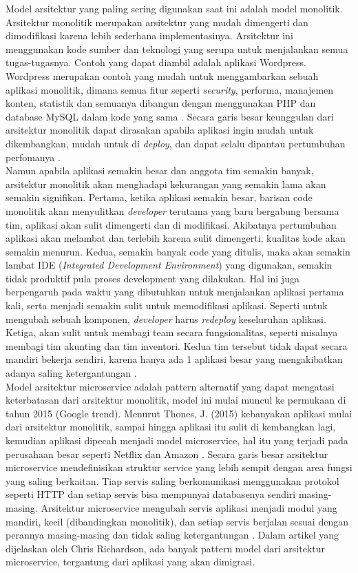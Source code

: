 Model arsitektur yang paling sering digunakan saat ini adalah model monolitik. Arsitektur monolitik merupakan arsitektur yang mudah dimengerti dan dimodifikasi karena lebih sederhana implementasinya. Arsitektur ini menggunakan kode sumber dan teknologi yang serupa untuk menjalankan semua tugas-tugasnya. Contoh yang dapat diambil adalah aplikasi Wordpress. Wordpress merupakan contoh yang mudah untuk menggambarkan sebuah aplikasi monolitik, dimana semua fitur seperti \textit{security}, performa, manajemen konten, statistik dan semuanya dibangun dengan menggunakan PHP dan database MySQL dalam kode yang sama \cite{5}. Secara garis besar keunggulan dari arsitektur monolitik dapat dirasakan apabila aplikasi ingin mudah untuk dikembangkan, mudah untuk di \textit{deploy}, dan dapat selalu dipantau pertumbuhan perfomanya \cite{5}.\\
Namun apabila aplikasi semakin besar dan anggota tim semakin banyak, arsitektur monolitik akan menghadapi kekurangan yang semakin lama akan semakin signifikan. Pertama, ketika aplikasi semakin besar, barisan code monolitik akan menyulitkan \textit{developer} terutama yang baru bergabung bersama tim, aplikasi akan sulit dimengerti dan di modifikasi. Akibatnya pertumbuhan aplikasi akan melambat dan terlebih karena sulit dimengerti, kualitas kode akan semakin menurun. Kedua, semakin banyak code yang ditulis, maka akan semakin lambat IDE (\textit{Integrated Development Environment}) yang digunakan, semakin tidak produktif pula proses development yang dilakukan. Hal ini juga berpengaruh pada waktu yang dibutuhkan untuk menjalankan aplikasi pertama kali, serta menjadi semakin sulit untuk memodifikasi aplikasi. Seperti untuk mengubah sebuah komponen, \textit{developer} harus \textit{redeploy} keseluruhan aplikasi. Ketiga, akan sulit untuk membagi team secara fungsionalitas, seperti misalnya membagi tim akunting dan tim inventori. Kedua tim tersebut tidak dapat secara mandiri bekerja sendiri, karena hanya ada 1 aplikasi besar yang mengakibatkan adanya saling ketergantungan \cite{7}.\\
Model arsitektur microservice adalah pattern alternatif yang dapat mengatasi keterbatasan dari arsitektur monolitik, model ini mulai muncul ke permukaan di tahun 2015 (Google trend). Menurut Thones, J. (2015) kebanyakan aplikasi mulai dari arsitektur monolitik, sampai hingga aplikasi itu sulit di kembangkan lagi, kemudian aplikasi dipecah menjadi model microservice, hal itu yang terjadi pada perusahaan besar seperti Netflix dan Amazon \cite{8}. Secara garis besar arsitektur microservice mendefinisikan struktur service yang lebih sempit dengan area fungsi yang saling berkaitan. Tiap servis saling berkomunikasi menggunakan protokol seperti HTTP dan setiap servis bisa mempunyai databasenya sendiri masing-masing. Arsitektur microservice mengubah servis aplikasi menjadi modul yang mandiri, kecil (dibandingkan monolitik), dan setiap servis berjalan sesuai dengan perannya masing-masing dan tidak saling ketergantungan \cite{6}. Dalam artikel yang dijelaskan oleh Chris Richardson, ada banyak pattern model dari arsitektur microservice, tergantung dari aplikasi yang akan dimigrasi.\\
